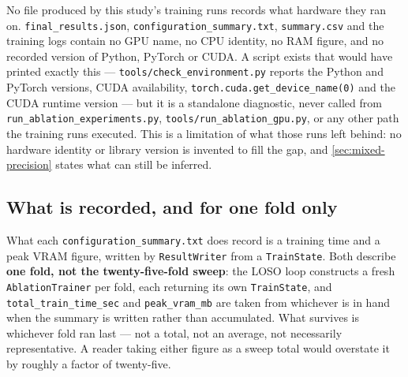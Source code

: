 No file produced by this study's training runs records what hardware they ran on. \texttt{final\_results.json}, \texttt{configuration\_summary.txt}, \texttt{summary.csv} and the training logs contain no GPU name, no CPU identity, no RAM figure, and no recorded version of Python, PyTorch or CUDA. A script exists that would have printed exactly this --- \texttt{tools/check\_environment.py} reports the Python and PyTorch versions, CUDA availability, \verb|torch.cuda.get_device_name(0)| and the CUDA runtime version --- but it is a standalone diagnostic, never called from \texttt{run\_ablation\_experiments.py}, \texttt{tools/run\_ablation\_gpu.py}, or any other path the training runs executed. This is a limitation of what those runs left behind: no hardware identity or library version is invented to fill the gap, and \autoref{sec:mixed-precision} states what can still be inferred.

\subsection{What is recorded, and for one fold only}
\label{sec:one-fold-only}

What each \texttt{configuration\_summary.txt} does record is a training time and a peak VRAM figure, written by \texttt{ResultWriter} from a \texttt{TrainState}. Both describe \textbf{one fold, not the twenty-five-fold sweep}: the LOSO loop constructs a fresh \texttt{AblationTrainer} per fold, each returning its own \texttt{TrainState}, and \texttt{total\_train\_time\_sec} and \texttt{peak\_vram\_mb} are taken from whichever is in hand when the summary is written rather than accumulated. What survives is whichever fold ran last --- not a total, not an average, not necessarily representative. A reader taking either figure as a sweep total would overstate it by roughly a factor of twenty-five.


